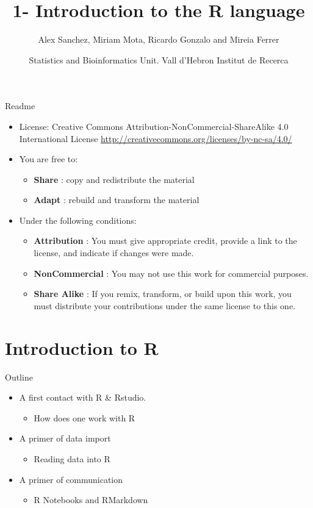 \documentclass[ignorenonframetext,]{beamer}
\title{1- Introduction to the R language}
\author{Alex Sanchez, Miriam Mota, Ricardo Gonzalo and Mireia Ferrer}
\date{Statistics and Bioinformatics Unit. Vall d'Hebron Institut de Recerca}
\providecommand{\tightlist}{%
  \setlength{\itemsep}{0pt}\setlength{\parskip}{0pt}}
\begin{document}
\frame{\titlepage}

\begin{frame}{Readme}

\begin{itemize}
\item
  License: Creative Commons Attribution-NonCommercial-ShareAlike 4.0
  International License
  \url{http://creativecommons.org/licenses/by-nc-sa/4.0/}
\item
  You are free to:

  \begin{itemize}
  \tightlist
  \item
    \textbf{Share} : copy and redistribute the material
  \item
    \textbf{Adapt} : rebuild and transform the material
  \end{itemize}
\item
  Under the following conditions:

  \begin{itemize}
  \tightlist
  \item
    \textbf{Attribution} : You must give appropriate credit, provide a
    link to the license, and indicate if changes were made.
  \item
    \textbf{NonCommercial} : You may not use this work for commercial
    purposes.
  \item
    \textbf{Share Alike} : If you remix, transform, or build upon this
    work, you must distribute your contributions under the same license
    to this one.
  \end{itemize}
\end{itemize}

\end{frame}

\section{Introduction to R}\label{introduction-to-r}

\begin{frame}{Outline}

\begin{itemize}
\tightlist
\item
  A first contact with R \& Rstudio.

  \begin{itemize}
  \tightlist
  \item
    How does one work with R
  \end{itemize}
\item
  A primer of data import

  \begin{itemize}
  \tightlist
  \item
    Reading data into R
  \end{itemize}
\item
  A primer of communication

  \begin{itemize}
  \tightlist
  \item
    R Notebooks and RMarkdown
  \end{itemize}
\end{itemize}

\end{frame}
\end{document}
